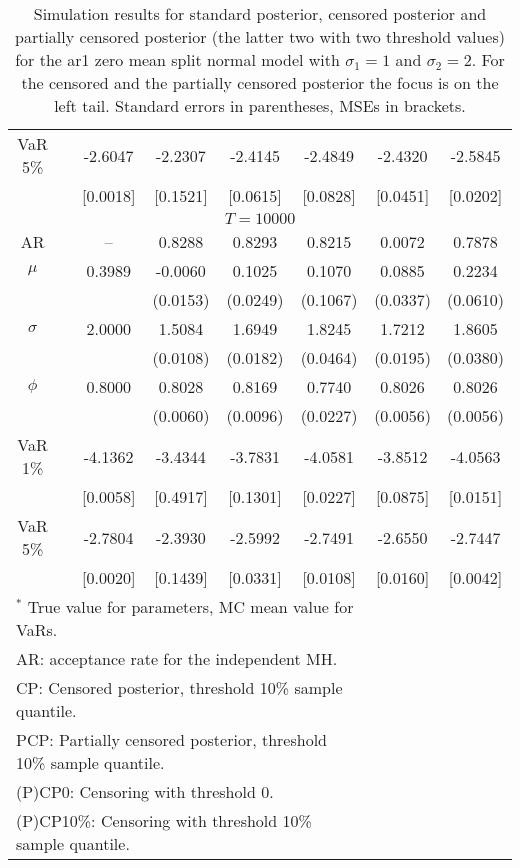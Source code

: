 {\begin{table}
\begin{tabular}{cc cccccc}
VaR 5\% && -2.6047 & -2.2307 & -2.4145 & -2.4849 & -2.4320 & -2.5845 \\ 
 && [0.0018] & [0.1521] & [0.0615] & [0.0828] & [0.0451] & [0.0202] \\ 
\hline 
\multicolumn{8}{c}{$T =10000$}  \\ 
\hline 
AR && -- & 0.8288 & 0.8293 & 0.8215 & 0.0072 & 0.7878 \\  
$\mu$&& 0.3989 & -0.0060 & 0.1025 & 0.1070 & 0.0885 & 0.2234 \\ 
&&   & (0.0153) & (0.0249) & (0.1067) & (0.0337) & (0.0610) \\ 
$\sigma$&& 2.0000 & 1.5084 & 1.6949 & 1.8245 & 1.7212 & 1.8605 \\ 
&&   & (0.0108) & (0.0182) & (0.0464) & (0.0195) & (0.0380) \\ 
$\phi$&& 0.8000 & 0.8028 & 0.8169 & 0.7740 & 0.8026 & 0.8026 \\ 
&&   & (0.0060) & (0.0096) & (0.0227) & (0.0056) & (0.0056) \\ 
VaR 1\% && -4.1362 & -3.4344 & -3.7831 & -4.0581 & -3.8512 & -4.0563 \\ 
  && [0.0058] & [0.4917] & [0.1301] & [0.0227] & [0.0875] & [0.0151] \\ 
VaR 5\% && -2.7804 & -2.3930 & -2.5992 & -2.7491 & -2.6550 & -2.7447 \\ 
 && [0.0020] & [0.1439] & [0.0331] & [0.0108] & [0.0160] & [0.0042] \\ 
\hline 
\multicolumn{6}{l}{\footnotesize{$^*$ True value for parameters, MC mean value for VaRs.}}  \\ 
\multicolumn{6}{l}{\footnotesize{AR: acceptance rate for the independent MH.}}  \\ 
\multicolumn{6}{l}{\footnotesize{CP: Censored posterior, threshold 10\% sample quantile.}}  \\ 
\multicolumn{6}{l}{\footnotesize{PCP: Partially censored posterior,  threshold 10\% sample quantile.}} \\ 
\multicolumn{6}{l}{\footnotesize{(P)CP0: Censoring with threshold 0.}} \\ 
\multicolumn{6}{l}{\footnotesize{(P)CP10\%: Censoring with threshold 10\% sample quantile.}}  \\ 
\end{tabular}
 \caption{Simulation results for standard posterior, censored posterior and partially censored posterior (the latter two with two threshold values) for the ar1 zero mean split normal model with $\sigma_{1} = 1$ and $\sigma_{2} = 2$. For the censored and the partially censored posterior the focus is on the left tail. Standard errors in parentheses, MSEs in brackets.} 
\label{tab:ar1_pcp}  
\end{table}
}